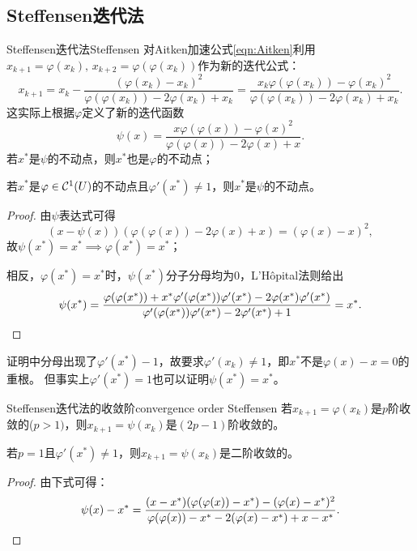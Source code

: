 \subsection{Steffensen迭代法}

\begin{theorem}
    {Steffensen迭代法}{Steffensen}
    对Aitken加速公式\eqref{eqn:Aitken}利用$x_{k+1}=\varphi(x_k),\,x_{k+2}=\varphi(\varphi(x_k))$作为新的迭代公式：
    \[
        x_{k+1}=x_k-\frac{(\varphi(x_k)-x_k)^2}{\varphi(\varphi(x_k))-2\varphi(x_k)+x_k}=\frac{x_k\varphi(\varphi(x_k))-\varphi(x_k)^2}{\varphi(\varphi(x_k))-2\varphi(x_k)+x_k}.
    \]
    这实际上根据$\varphi$定义了新的迭代函数
    \begin{equation}
        \psi(x)=\frac{x\varphi(\varphi(x))-\varphi(x)^2}{\varphi(\varphi(x))-2\varphi(x)+x}.
    \end{equation}
    若$x^*$是$\psi$的不动点，则$x^*$也是$\varphi$的不动点；

    若$x^*$是$\varphi\in\mathcal C^1(U)$的不动点且$\varphi'(x^*)\neq 1$，则$x^*$是$\psi$的不动点。
\end{theorem}

\begin{proof}
    由$\psi$表达式可得
    \[
        (x-\psi(x))(\varphi(\varphi(x))-2\varphi(x)+x)=(\varphi(x)-x)^2,
    \]
    故$\psi(x^*)=x^*\implies\varphi(x^*)=x^*$；

    相反，$\varphi(x^*)=x^*$时，$\psi(x^*)$分子分母均为0，L'H\^opital法则给出
    \[
        \psi(x^*)=\frac{\varphi(\varphi(x^*))+x^*\varphi'(\varphi(x^*))\varphi'(x^*)-2\varphi(x^*)\varphi'(x^*)}{\varphi'(\varphi(x^*))\varphi'(x^*)-2\varphi'(x^*)+1}=x^*.
        \qedhere
    \]
\end{proof}

\begin{remark}
    证明中分母出现了$\varphi'(x^*)-1$，故要求$\varphi'(x_k)\neq 1$，即$x^*$不是$\varphi(x)-x=0$的重根。
    但事实上$\varphi'(x^*)=1$也可以证明$\psi(x^*)=x^*$。
\end{remark}

\begin{theorem}
    {Steffensen迭代法的收敛阶}{convergence order Steffensen}
    若$x_{k+1}=\varphi(x_k)$是$p$阶收敛的($p>1)$，则$x_{k+1}=\psi(x_k)$是$(2p-1)$阶收敛的。

    若$p=1$且$\varphi'(x^*)\neq 1$，则$x_{k+1}=\psi(x_k)$是二阶收敛的。
\end{theorem}

\begin{proof}
    由下式可得：
    \[
        \psi(x)-x^*=\frac{(x-x^*)(\varphi(\varphi(x))-x^*)-(\varphi(x)-x^*)^2}{\varphi(\varphi(x))-x^*-2(\varphi(x)-x^*)+x-x^*}.
        \qedhere
    \]
\end{proof}

